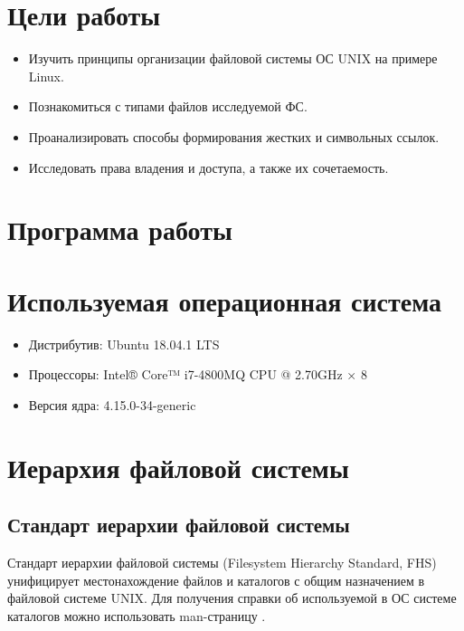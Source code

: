 





\tableofcontents
\newpage

\section{Цели работы}

\begin{itemize}
	\item Изучить принципы организации файловой системы ОС UNIX на примере Linux.
	\item Познакомиться с типами файлов исследуемой ФС.
	\item Проанализировать способы формирования жестких и символьных ссылок.
	\item Исследовать права владения и доступа, а также их сочетаемость.
\end{itemize}

\section{Программа работы}



\section{Используемая операционная система}

\begin{itemize}
	\item Дистрибутив: Ubuntu 18.04.1 LTS
	\item Процессоры: Intel® Core™ i7-4800MQ CPU @ 2.70GHz × 8
	\item Версия ядра: 4.15.0-34-generic
\end{itemize}

\section{Иерархия файловой системы}

\subsection{Стандарт иерархии файловой системы}

Стандарт иерархии файловой системы (Filesystem Hierarchy Standard, FHS) унифицирует местонахождение файлов и каталогов с общим назначением в файловой системе UNIX. Для получения справки об используемой в ОС системе каталогов можно использовать man-страницу .

